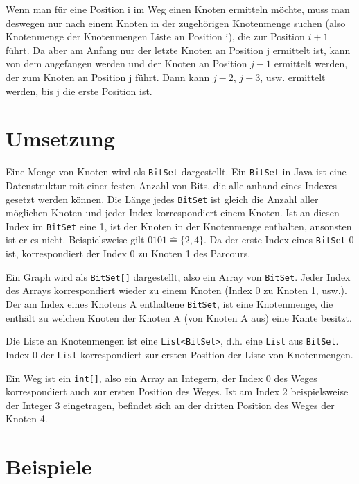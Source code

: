\documentclass[a4paper,10pt,ngerman]{scrartcl}
\begin{document}
	Wenn man für eine Position i im Weg einen Knoten ermitteln möchte,
	muss man deswegen nur nach einem Knoten in der zugehörigen Knotenmenge suchen
	(also Knotenmenge der Knotenmengen Liste an Position i),
	die zur Position $i + 1$ führt.
	Da aber am Anfang nur der letzte Knoten an Position j ermittelt ist,
	kann von dem angefangen werden und der Knoten an Position $j - 1$ ermittelt werden,
	der zum Knoten an Position j führt.
	Dann kann $j - 2$, $j - 3$, usw. ermittelt werden,
	bis j die erste Position ist.


    \section{Umsetzung}\label{sec:umsetzung}
	Eine Menge von Knoten wird als \texttt{BitSet} dargestellt.
	Ein \texttt{BitSet} in Java ist eine Datenstruktur mit einer festen Anzahl von Bits,
	die alle anhand eines Indexes gesetzt werden können.
	Die Länge jedes \texttt{BitSet} ist gleich die Anzahl aller möglichen Knoten
	und jeder Index korrespondiert einem Knoten.
	Ist an diesen Index im \texttt{BitSet} eine 1,
	ist der Knoten in der Knotenmenge enthalten, ansonsten ist er es nicht.
	Beispielsweise gilt $0101 \widehat{=} \{2, 4\}$.
	Da der erste Index eines \texttt{BitSet} 0 ist,
	korrespondiert der Index 0 zu Knoten 1 des Parcours.
	
	Ein Graph wird als \texttt{BitSet[]} dargestellt, also ein Array von \texttt{BitSet}.
	Jeder Index des Arrays korrespondiert wieder zu einem Knoten (Index 0 zu Knoten 1, usw.).
	Der am Index eines Knotens A enthaltene \texttt{BitSet}, ist eine Knotenmenge,
	die enthält zu welchen Knoten der Knoten A (von Knoten A aus) eine Kante besitzt.
	
	Die Liste an Knotenmengen ist eine \texttt{List<BitSet>},
	d.h. eine \texttt{List} aus \texttt{BitSet}.
	Index 0 der \texttt{List} korrespondiert zur ersten Position der Liste von Knotenmengen.
	
	Ein Weg ist ein \texttt{int[]}, also ein Array an Integern,
	der Index 0 des Weges korrespondiert auch zur ersten Position des Weges.
	Ist am Index 2 beispielsweise der Integer 3 eingetragen,
	befindet sich an der dritten Position des Weges der Knoten 4.


    \section{Beispiele}\label{sec:beispiele}
\end{document}
